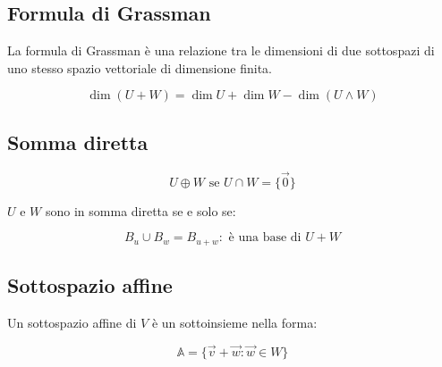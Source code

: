 \documentclass{subfiles}
\begin{document}
\subsection{Formula di Grassman}

La formula di Grassman è una relazione tra le dimensioni di due sottospazi di uno stesso spazio vettoriale di dimensione finita.

$$
\dim(U + W) = \dim U + \dim W - \dim(U \wedge W)
$$

\subsection{Somma diretta}

$$
U \oplus W \text{ se } U \cap W = \{ \vec{0} \}
$$

\noindent
$U$ e $W$ sono in somma diretta se e solo se:

$$
B_u \cup B_w = B_{u+w} : \text{ è una base di } U + W
$$

\subsection{Sottospazio affine}

Un sottospazio affine di $V$ è un sottoinsieme nella forma:

$$
\mathbb{A} = \{ \vec{v} + \vec{w} : \vec{w} \in W \}
$$
\end{document}
